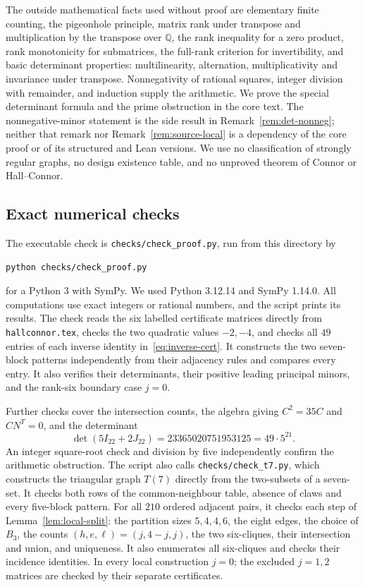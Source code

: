 \documentclass[11pt]{article}
\newcommand\rats{{\mathbb Q}}
\theoremstyle{definition}
\newcommand{\code}[1]{{\small\nolinkurl{#1}}}
\begin{document}
The outside mathematical facts used without proof are elementary
finite counting, the pigeonhole principle, matrix rank under transpose
and multiplication by the transpose over $\rats$, the rank inequality
for a zero product, rank monotonicity for submatrices, the full-rank
criterion for invertibility, and basic determinant properties:
multilinearity, alternation, multiplicativity and invariance under
transpose. Nonnegativity of rational squares,
integer division with remainder, and induction supply the arithmetic.
We prove the special determinant formula and the prime obstruction
in the core text. The nonnegative-minor statement is the side result
in Remark~\ref{rem:det-nonneg}; neither that remark nor
Remark~\ref{rem:source-local} is a dependency of the core proof or
of its structured and Lean versions. We use no
classification of strongly regular graphs, no design existence table,
and no unproved theorem of Connor or Hall--Connor.

\subsection*{Exact numerical checks}

The executable check is \code{checks/check_proof.py}, run from this
directory by
\begin{lstlisting}
python checks/check_proof.py
\end{lstlisting}
for a Python 3 with SymPy. We used Python 3.12.14 and SymPy 1.14.0. All
computations use exact integers or rational numbers, and the script
prints its results. The check reads the six labelled certificate
matrices directly from \code{hallconnor.tex}, checks the two quadratic
values $-2,-4$, and checks all $49$ entries of each inverse identity
in~\eqref{eq:inverse-cert}. It constructs the two seven-block patterns
independently from their adjacency rules and compares every entry.
It also verifies their determinants, their positive leading principal
minors, and the rank-six boundary case $j=0$.

Further checks cover the intersection counts, the algebra giving
$C^2=35C$ and $CN^T=0$, and the determinant
\[
 \det(5I_{22}+2J_{22})=23365020751953125=49\cdot5^{21}.
\]
An integer square-root check and division by five independently
confirm the arithmetic obstruction. The script also calls
\code{checks/check_t7.py}, which constructs the triangular graph
$T(7)$ directly from the two-subsets of a seven-set. It checks both
rows of the common-neighbour table, absence of claws and every
five-block pattern. For all $210$ ordered adjacent pairs, it checks
each step of Lemma~\ref{lem:local-split}: the partition sizes
$5,4,4,6$, the eight edges, the choice of $B_3$, the counts
$(h,e,\ell)=(j,4-j,j)$, the two six-cliques, their intersection and
union, and uniqueness. It also enumerates all six-cliques and checks
their incidence identities. In every local construction $j=0$;
the excluded $j=1,2$ matrices are checked by their separate certificates.
\end{document}
